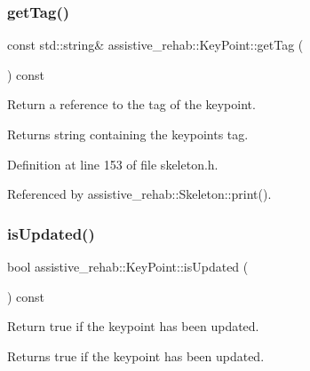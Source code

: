 \mbox{\label{classassistive__rehab_1_1KeyPoint_ace24db46297c42bee32acd87d7450dcd}} 
\subsubsection{\texorpdfstring{getTag()}{getTag()}}
{\footnotesize\ttfamily const std\+::string\& assistive\+\_\+rehab\+::\+Key\+Point\+::get\+Tag (\begin{DoxyParamCaption}{ }\end{DoxyParamCaption}) const\hspace{0.3cm}{\ttfamily [inline]}}



Return a reference to the tag of the keypoint. 

\begin{DoxyReturn}{Returns}
string containing the keypoint\textquotesingle{}s tag. 
\end{DoxyReturn}


Definition at line 153 of file skeleton.\+h.


\begin{DoxyCode}{0}

\end{DoxyCode}


Referenced by assistive\+\_\+rehab\+::\+Skeleton\+::print().

\mbox{\label{classassistive__rehab_1_1KeyPoint_ab1c339fe8a6dd281534d54bb0fdb3c50}} 
\subsubsection{\texorpdfstring{isUpdated()}{isUpdated()}}
{\footnotesize\ttfamily bool assistive\+\_\+rehab\+::\+Key\+Point\+::is\+Updated (\begin{DoxyParamCaption}{ }\end{DoxyParamCaption}) const\hspace{0.3cm}{\ttfamily [inline]}}



Return true if the keypoint has been updated. 

\begin{DoxyReturn}{Returns}
true if the keypoint has been updated. 
\end{DoxyReturn}


